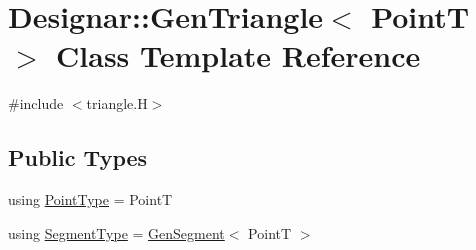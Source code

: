 \hypertarget{class_designar_1_1_gen_triangle}{}\section{Designar\+:\+:Gen\+Triangle$<$ PointT $>$ Class Template Reference}
\label{class_designar_1_1_gen_triangle}


{\ttfamily \#include $<$triangle.\+H$>$}

\subsection*{Public Types}
\begin{DoxyCompactItemize}
\item 
using \hyperlink{class_designar_1_1_gen_triangle_ac6e39b72d793f44a6e12b4f0ede6d472}{Point\+Type} = PointT
\item 
using \hyperlink{class_designar_1_1_gen_triangle_a97d5ba127bcf8f120b1d408215956cee}{Segment\+Type} = \hyperlink{class_designar_1_1_gen_segment}{Gen\+Segment}$<$ PointT $>$
\end{DoxyCompactItemize}
